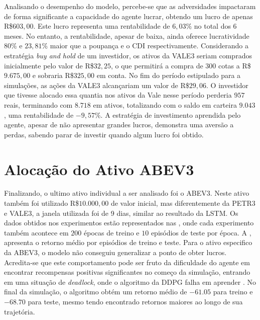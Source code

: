 Analisando o desempenho do modelo, percebe-se que as adversidades impactaram de forma significante a capacidade do agente lucrar, obtendo um lucro de apenas R\$$603,00$. Este lucro representa uma rentabilidade de $6,03\%$ no total dos 6 meses. No entanto, a rentabilidade, apesar de baixa, ainda oferece lucratividade $80\%$ e $23,81\%$ maior que a poupança e o CDI respectivamente. Considerando a estratégia \emph{buy and hold} de um investidor, os ativos da VALE3 seriam comprados inicialmente pelo valor de R\$$32,25$, o que permitirá a compra de $300$ cotas a R\$$9.675,00$ e sobraria R\$$325,00$ em conta. No fim do período estipulado para a simulações, as ações da VALE3 alcançariam um valor de R\$$29,06$. O investidor que tivesse alocado essa quantia nos ativos da Vale nesse período perderia $957$ reais, terminando com $8.718$ em ativos, totalizando com o saldo em carteira $9.043$, uma rentabilidade de $-9,57\%$. A estratégia de investimento aprendida pelo agente, apesar de não apresentar grandes lucros, demonstra uma aversão a perdas, sabendo parar de investir quando algum lucro foi obtido.


\section{Alocação do Ativo ABEV3}

Finalizando, o ultimo ativo individual a ser analisado foi o ABEV3. Neste ativo também foi utilizado R\$$10.000,00$ de valor inicial, mas diferentemente da PETR3 e VALE3, a janela utilizada foi de 9 dias, similar ao resultado da \acrshort{LSTM}. Os dados obtidos nos experimentos estão representados nas , onde cada experimento também acontece em $200$ épocas de treino e $10$ episódios de teste por época. A , apresenta o retorno médio por episódios de treino e teste. Para o ativo especifico da ABEV3, o modelo não conseguiu generalizar a ponto de obter lucros. Acredita-se que este comportamento pode ser fruto da dificuldade do agente em encontrar recompensas positivas significantes no começo da simulação, entrando em uma situação de \emph{deadlock}, onde o algoritmo da \acrshort{DDPG} falha em aprender \cite{matheron2019problem}. No final da simulação, o algoritmo obtém um retorno médio de $-61.05$ para treino e $-68.70$ para teste, mesmo tendo encontrado retornos maiores ao longo de sua trajetória. 



